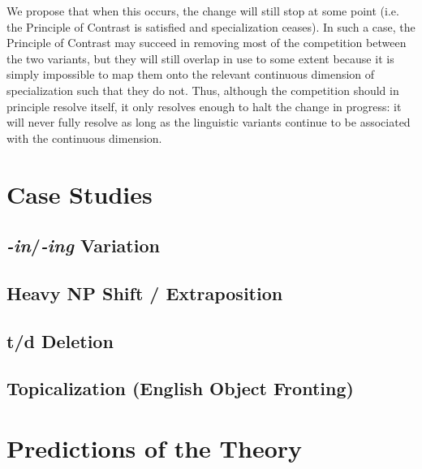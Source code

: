 We propose that when this occurs, the change will still stop at some point (i.e. the Principle of Contrast is satisfied and specialization ceases).
In such a case, the Principle of Contrast may succeed in removing most of the competition between the two variants, but they will still overlap in use to some extent because it is simply impossible to map them onto the relevant continuous dimension of specialization such that they do not.
Thus, although the competition should in principle resolve itself, it only resolves enough to halt the change in progress: it will never fully resolve as long as the linguistic variants continue to be associated with the continuous dimension.

\section{Case Studies}
\label{cases}

\subsection{\textsl{-in}/\textsl{-ing} Variation}

\subsection{Heavy NP Shift / Extraposition}

\subsection{t/d Deletion}

\subsection{Topicalization (English Object Fronting)}
\label{topsect}

\section{Predictions of the Theory}

